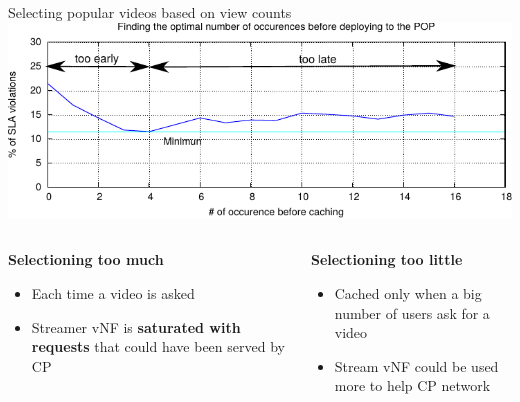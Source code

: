 \documentclass[a4paper]{beamer}
\begin{document}
\begin{frame}{Selecting popular videos based on view counts}
	\includegraphics[width=0.90\linewidth]{cachingStrat_evaluation.pdf}
		\begin{columns}[T]
		\begin{column}[T]{0.5 \textwidth} 
		
		\textbf{Selectioning too much}
			\begin{itemize}
				\item Each time a video is asked
				\item Streamer vNF is \textbf{saturated with requests} that could have been served by CP
			\end{itemize}
		\end{column}
										
		\begin{column}[T]{0.5\textwidth} 
										  
			\textbf{Selectioning too little}
			\begin{itemize}
				\item Cached only when a big number of users ask for a video
				\item Stream vNF could be used more to help CP network
			\end{itemize}
			
		\end{column}
																										
	\end{columns}
\end{frame}
\end{document}
